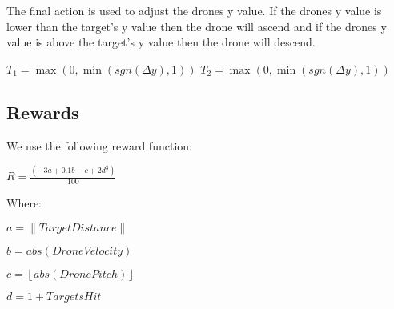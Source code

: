 The final action is used to adjust the drones y value. If the drones y value is lower than the target's y value then the drone will ascend and if the drones y value is above the target's y value then the drone will descend. 

\begingroup\centering
$T_1 =  \max (0,\min (sgn(\Delta y),1))$
$T_2 =  \max (0,\min (sgn(\Delta y),1))$

\endgroup

\subsection{Rewards}
We use the following reward function:

\begingroup\centering

$R=\frac{(-3a+0.1b-c+2d^3)}{100}$

\endgroup

Where:

\begingroup\centering
$a=\left \| Target Distance \right \|$

$b=abs(Drone Velocity)$

$c= \left \lfloor abs(DronePitch)  \right \rfloor $

$d=1+TargetsHit$

\endgroup
